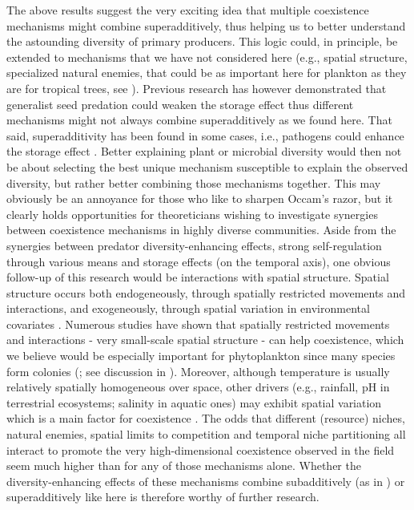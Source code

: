 \documentclass[a4paper,12pt]{article}
\begin{document}
The above results suggest the very exciting idea that multiple coexistence
mechanisms might combine superadditively, thus helping us to better
understand the astounding diversity of primary producers. This logic
could, in principle, be extended to mechanisms that we have not considered
here (e.g., spatial structure, specialized natural enemies, that could
be as important here for plankton as they are for tropical trees,
see \citealp{bagchi_pathogens_2014,comita_testing_2014,barraquand2018coastal}).
Previous research has however demonstrated that generalist seed predation
could weaken the storage effect \citep{kuang_coexistence_2009,kuang_interacting_2010}
thus different mechanisms might not always combine superadditively
as we found here. That said, superadditivity has been found in some
cases, i.e., pathogens could enhance the storage effect \citep{mordecai_pathogen_2015}.
Better explaining plant or microbial diversity would then not be about
selecting the best unique mechanism susceptible to explain the observed
diversity, but rather better combining those mechanisms together.
This may obviously be an annoyance for those who like to sharpen Occam's
razor, but it clearly holds opportunities for theoreticians wishing
to investigate synergies between coexistence mechanisms in highly
diverse communities. Aside from the synergies between predator diversity-enhancing
effects, strong self-regulation through various means and storage
effects (on the temporal axis), one obvious follow-up of this research
would be interactions with spatial structure. Spatial structure occurs
both endogeneously, through spatially restricted movements and interactions,
and exogeneously, through spatial variation in environmental covariates
\citep{bolker_combining_2003}. Numerous studies \citep[e.g.,][]{bolker_spatial_1999,murrell_2002}
have shown that spatially restricted movements and interactions -
very small-scale spatial structure - can help coexistence, which we
believe would be especially important for phytoplankton since many
species form colonies (\citealp{reynolds2006ecology}; see discussion
in \citealp{barraquand2018coastal}). Moreover, although temperature
is usually relatively spatially homogeneous over space, other drivers
(e.g., rainfall, pH in terrestrial ecosystems; salinity in aquatic
ones) may exhibit spatial variation which is a main factor for coexistence
\citep{snyder_when_2008}. The odds that different (resource) niches,
natural enemies, spatial limits to competition and temporal niche
partitioning all interact to promote the very high-dimensional coexistence
observed in the field seem much higher than for any of those mechanisms
alone. Whether the diversity-enhancing effects of these mechanisms
combine subadditively (as in \citealp{kuang_interacting_2010}) or
superadditively like here is therefore worthy of further research. 
\end{document}
